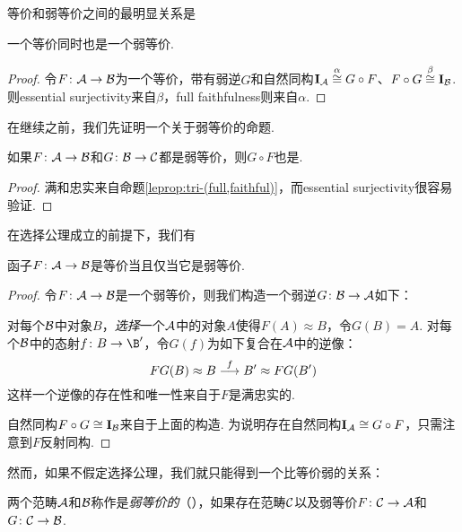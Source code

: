   等价和弱等价之间的最明显关系是
  \begin{prop}
    一个等价同时也是一个弱等价.
  \end{prop}
  \begin{proof}
    令$F\colon{\cal A}\to{\cal B}$为一个等价，带有弱逆$G$和自然同构$\operatorname{\mathbf{I}}_{{\cal A}}\stackrel{\alpha}{\cong} G\circ F$、$F\circ G \stackrel{\beta}{\cong} \operatorname{\mathbf{I}}_{{\cal B}}$.
    则essential surjectivity来自$\beta$，full faithfulness则来自$\alpha$.
  \end{proof}

  在继续之前，我们先证明一个关于弱等价的命题.
  \begin{prop}
    如果$F\colon{\cal A}\to{\cal B}$和$G\colon{\cal B}\to{\cal C}$都是弱等价，则$G\circ F$也是.
  \end{prop}
  \begin{proof}
    满和忠实来自命题\ref{leprop:tri-(full,faithful)}，而essential surjectivity很容易验证.
  \end{proof}

  在选择公理成立的前提下，我们有
  \begin{prop}
    函子$F\colon{\cal A}\to{\cal B}$是等价当且仅当它是弱等价.
  \end{prop}
  \begin{proof}
    令$F\colon{\cal A}\to{\cal B}$是一个弱等价，则我们构造一个弱逆$G\colon{\cal B}\to{\cal A}$如下：

    对每个${\cal B}$中对象$B$，\emph{选择}一个${\cal A}$中的对象$A$使得$F(A)\approx B$，令$G(B)=A$.
    对每个${\cal B}$中的态射$f\colon B\to\B'$，令$G(f)$为如下复合在${\cal A}$中的逆像：
    \begin{equation*}
      FG(B)\approx B\stackrel{{f}}{\longrightarrow} B'\approx FG(B')
    \end{equation*}
    这样一个逆像的存在性和唯一性来自于$F$是满忠实的.

    自然同构$F\circ G\cong \operatorname{\mathbf{I}}_{{\cal B}}$来自于上面的构造. 为说明存在自然同构$\operatorname{\mathbf{I}}_{{\cal A}}\cong G\circ F$，只需注意到$F$反射同构.
  \end{proof}

  然而，如果不假定选择公理，我们就只能得到一个比等价弱的关系：
  \begin{defn}
    两个范畴${\cal A}$和${\cal B}$称作是\emph{弱等价的}（），如果存在范畴${\cal C}$以及弱等价$F\colon{\cal C}\to{\cal A}$和$G\colon{\cal C}\to{\cal B}$.
  \end{defn}

